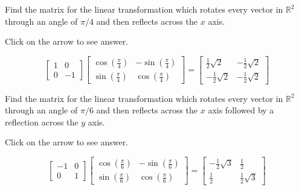\documentclass{ximera}
\begin{document}
\begin{problem}\label{prb:6.18} Find the matrix for the linear transformation which rotates every
vector in $\mathbb{R}^{2}$ through an angle of $\pi /4$ and then reflects
across the $x$ axis.

Click on the arrow to see answer.
\begin{expandable}
\[
\left[
\begin{array}{rr}
1 & 0 \\
0 & -1
\end{array}
\right] \left[
\begin{array}{cc}
\cos \left( \frac{\pi }{4}\right)  & -\sin \left( \frac{\pi }{4}\right)  \\
\sin \left( \frac{\pi }{4}\right)  & \cos \left( \frac{\pi }{4}\right)
\end{array}
\right]  =  \left[
\begin{array}{cc}
\frac{1}{2}\sqrt{2} & -\frac{1}{2}\sqrt{2} \\
-\frac{1}{2}\sqrt{2} & -\frac{1}{2}\sqrt{2}
\end{array}
\right]
\]
\end{expandable}
\end{problem}

\begin{problem}\label{prb:6.19} Find the matrix for the linear transformation which rotates every
vector in $\mathbb{R}^{2}$ through an angle of $\pi /6$ and then reflects
across the $x$ axis followed by a reflection across the $y$ axis.

Click on the arrow to see answer.
\begin{expandable}
\[
\left[
\begin{array}{rr}
-1 & 0 \\
0 & 1
\end{array}
\right] \left[
\begin{array}{cc}
\cos \left( \frac{\pi }{6}\right)  & -\sin \left( \frac{\pi }{6}\right)  \\
\sin \left( \frac{\pi }{6}\right)  & \cos \left( \frac{\pi }{6}\right)
\end{array}
\right] = \left[
\begin{array}{cc}
-\frac{1}{2}\sqrt{3} & \frac{1}{2} \\
\frac{1}{2} & \frac{1}{2}\sqrt{3}
\end{array}
\right]
\]
\end{expandable}
\end{problem}
\end{document}

